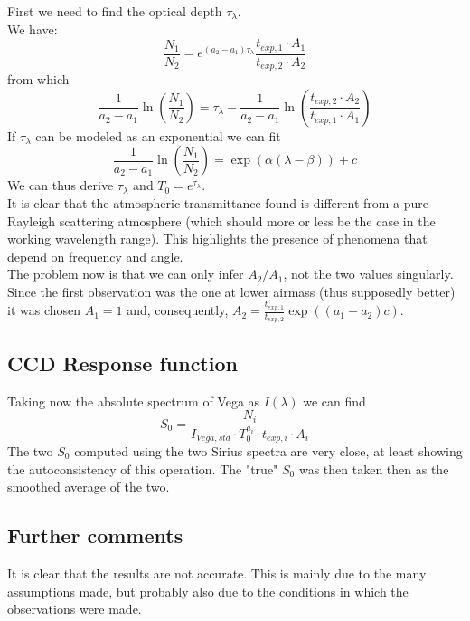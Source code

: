 \documentclass[a4paper]{article}
\begin{document}
\begin{multicols}{2}
			First we need to find the optical depth $\tau_{\lambda}$.\\
			We have:
			\begin{equation}
					\frac{N_1}{N_2} = e^{(a_2 - a_1) \tau_{\lambda}} \frac{t_{exp,1} \cdot A_1}{t_{exp,2} \cdot A_2}
			\end{equation}
			from which
			\begin{equation}
				\frac{1}{a_2 - a_1}\ln\left(\frac{N_1}{N_2}\right) = \tau_{\lambda} - \frac{1}{a_2 - a_1}\ln\left(\frac{t_{exp,2} \cdot A_2}{t_{exp,1} \cdot A_1}\right)
			\end{equation}
			\newline
			If $\tau_{\lambda}$ can be modeled as an exponential we can fit
			\begin{equation*}
				\frac{1}{a_2 - a_1}\ln\left(\frac{N_1}{N_2}\right) = \exp(\alpha (\lambda - \beta)) + c
			\end{equation*}
			\newline
			We can thus derive $\tau_{\lambda}$ and $T_0 = e^{\tau_{\lambda}}$.\\
			It is clear that the atmospheric transmittance found is different from a pure Rayleigh scattering atmosphere (which should more or less be the case in the working wavelength range). This highlights the presence of phenomena that depend on frequency and angle.\\
			
			The problem now is that we can only infer $A_2/A_1$, not the two values singularly.\\
			Since the first observation was the one at lower airmass (thus supposedly better) it was chosen $A_1 = 1$ and, consequently, $A_2 = \frac{t_{exp,1}}{t_{exp,2}} \exp((a_1 - a_2)c)$.\\
		
		\subsection{CCD Response function}
			Taking now the absolute spectrum of Vega as $I(\lambda)$ we can find
			\begin{equation*}
				S_0 = \frac{N_i}{I_{Vega,std} \cdot T_0^{a_i} \cdot t_{exp,i} \cdot A_i}
			\end{equation*}
			The two $S_0$ computed using the two Sirius spectra are very close, at least showing the autoconsistency of this operation. The "true" $S_0$ was then taken then as the smoothed average of the two.
		
		\subsection{Further comments}
			It is clear that the results are not accurate. This is mainly due to the many assumptions made, but probably also due to the conditions in which the observations were made.\\
			

\end{multicols}
\end{document}
